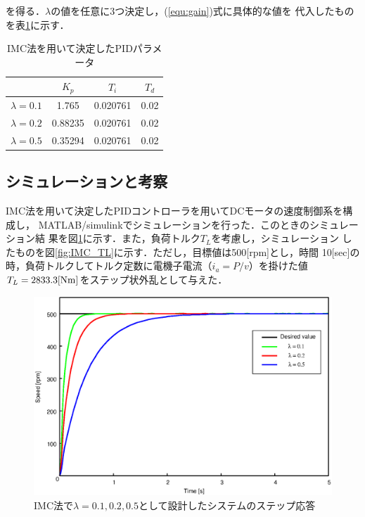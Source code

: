 \documentclass[a4paper,12pt]{jarticle}
\begin{document}
%
を得る．$\lambda$の値を任意に3つ決定し，(\ref{equ:gain})式に具体的な値を
代入したものを表\ref{tab:IMC_para}に示す．
%
\begin{table}[b]
 \centering
 \caption{IMC法を用いて決定したPIDパラメータ}
 \label{tab:IMC_para}
  \begin{tabular}{c||c|c|c}\hline
       \        &$K_p$  &$T_i$   &$T_d$\\\hline
   $\lambda=0.1$&1.765  &0.020761&0.02\\\hline
   $\lambda=0.2$&0.88235&0.020761&0.02\\\hline
   $\lambda=0.5$&0.35294&0.020761&0.02\\\hline
 \end{tabular}
\end{table}
%
\subsection{シミュレーションと考察}
IMC法を用いて決定したPIDコントローラを用いてDCモータの速度制御系を構成し，
MATLAB/simulinkでシミュレーションを行った．このときのシミュレーション結
果を図\ref{fig:IMC_result}に示す．また，負荷トルク$T_L$を考慮し，シミュレーション
したものを図\ref{fig:IMC_TL}に示す．ただし，目標値は500[rpm]とし，時間
10[sec]の時，負荷トルクしてトルク定数に電機子電流（$i_a = P/v$）を掛けた値
$T_L=2833.3[\rm{Nm}]$をステップ状外乱として与えた\cite{mecha}．
%
\begin{figure}[tbp]
 \begin{center}
  \includegraphics[width = 150mm]{fig/IMC_result.eps}
 \end{center}
 \caption{IMC法で$\lambda=0.1,0.2,0.5$として設計したシステムのステップ応答}
 \label{fig:IMC_result}
\end{figure}
\end{document}
